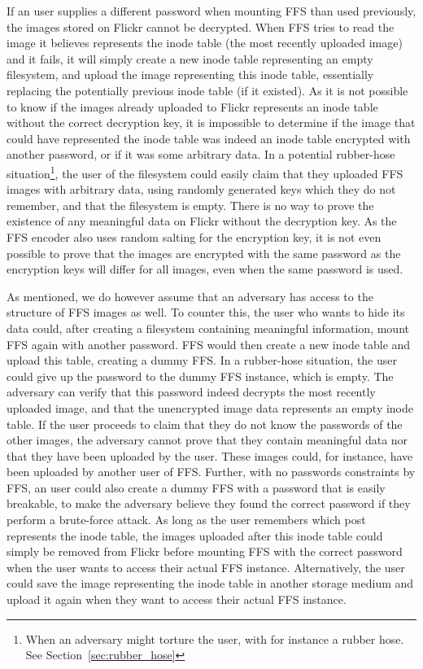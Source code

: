 If an user supplies a different password when mounting FFS than used previously, the images stored on Flickr cannot be decrypted. When FFS tries to read the image it believes represents the inode table (the most recently uploaded image) and it fails, it will simply create a new inode table representing an empty filesystem, and upload the image representing this inode table, essentially replacing the potentially previous inode table (if it existed). As it is not possible to know if the images already uploaded to Flickr represents an inode table without the correct decryption key, it is impossible to determine if the image that could have represented the inode table was indeed an inode table encrypted with another password, or if it was some arbitrary data. In a potential rubber-hose situation\footnote{When an adversary might torture the user, with for instance a rubber hose. See Section~\ref{sec:rubber_hose}}, the user of the filesystem could easily claim that they uploaded FFS images with arbitrary data, using randomly generated keys which they do not remember, and that the filesystem is empty. There is no way to prove the existence of any meaningful data on Flickr without the decryption key. As the FFS encoder also uses random salting for the encryption key, it is not even possible to prove that the images are encrypted with the same password as the encryption keys will differ for all images, even when the same password is used. 

As mentioned, we do however assume that an adversary has access to the structure of FFS images as well. To counter this, the user who wants to hide its data could, after creating a filesystem containing meaningful information, mount FFS again with another password. FFS would then create a new inode table and upload this table, creating a dummy FFS. In a rubber-hose situation, the user could give up the password to the dummy FFS instance, which is empty. The adversary can verify that this password indeed decrypts the most recently uploaded image, and that the unencrypted image data represents an empty inode table. If the user proceeds to claim that they do not know the passwords of the other images, the adversary cannot prove that they contain meaningful data nor that they have been uploaded by the user. These images could, for instance, have been uploaded by another user of FFS. Further, with no passwords constraints by FFS, an user could also create a dummy FFS with a password that is easily breakable, to make the adversary believe they found the correct password if they perform a brute-force attack. As long as the user remembers which post represents the inode table, the images uploaded after this inode table could simply be removed from Flickr before mounting FFS with the correct password when the user wants to access their actual FFS instance. Alternatively, the user could save the image representing the inode table in another storage medium and upload it again when they want to access their actual FFS instance.